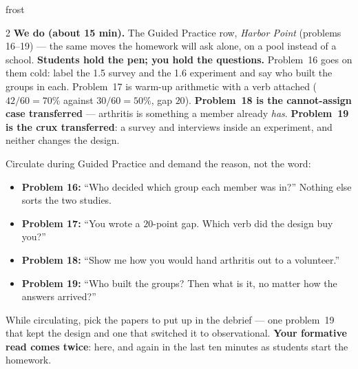 \documentclass[10pt]{article}
\begin{document}
\begin{skillbox}{frost}
\begin{multicols}{2}
\columnbreak
\textbf{We do (about 15 min).} The Guided Practice row, \emph{Harbor Point} (problems
16--19) --- the same moves the homework will ask alone, on a pool instead of a school.
\textbf{Students hold the pen; you hold the questions.} Problem~16 goes on them cold: label the
1.5 survey and the 1.6 experiment and say who built the groups in each. Problem~17 is warm-up
arithmetic with a verb attached ($42/60 = 70\%$ against $30/60 = 50\%$, gap $20$).
\textbf{Problem~18 is the cannot-assign case transferred} --- arthritis is something a member
already \emph{has}. \textbf{Problem~19 is the crux transferred}: a survey and interviews inside
an experiment, and neither changes the design.

Circulate during Guided Practice and demand the reason, not the word:
\begin{itemize}[leftmargin=1.1em, nosep]
  \item \textbf{Problem 16:} ``Who decided which group each member was in?'' Nothing else sorts
        the two studies.
  \item \textbf{Problem 17:} ``You wrote a $20$-point gap. Which verb did the design buy you?''
  \item \textbf{Problem 18:} ``Show me how you would hand arthritis out to a volunteer.''
  \item \textbf{Problem 19:} ``Who built the groups? Then what is it, no matter how the answers
        arrived?''
\end{itemize}
While circulating, pick the papers to put up in the debrief --- one problem~19 that kept the
design and one that switched it to observational. \textbf{Your formative read comes twice}:
here, and again in the last ten minutes as students start the homework.
\end{multicols}
\end{skillbox}
\end{document}
